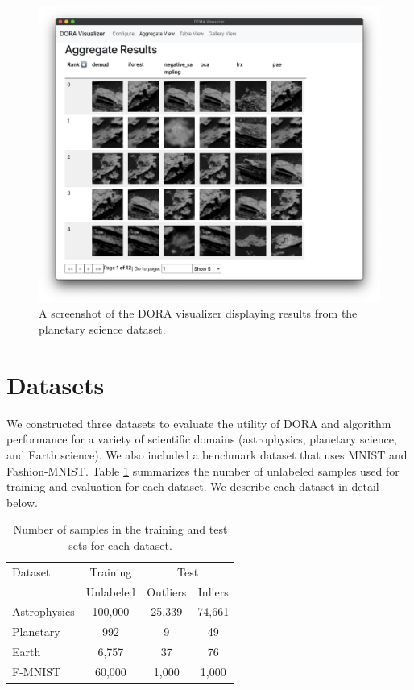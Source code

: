 \documentclass[utf8]{frontiersFPHY} %
\begin{document}
\begin{figure}
  \centering
  \includegraphics[width=0.83\linewidth]{figures/doravis.png}
  \caption{A screenshot of the DORA visualizer displaying results from the
  planetary science dataset.}
  \label{fig:doravis}
\end{figure}


\section{Datasets}
We constructed three datasets to evaluate the utility of DORA and 
algorithm performance for a variety of scientific domains
(astrophysics, planetary science, and Earth science). We also included a 
benchmark dataset that uses MNIST and Fashion-MNIST. Table \ref{tab:datasets}
summarizes the number of unlabeled samples used for training and evaluation for
each dataset. We describe each dataset in detail below.

\begin{table}
\caption{Number of samples in the training and test sets for each dataset.}
\label{tab:datasets}
\centering
\begin{tabular}{l|c|cc}
  \toprule
  Dataset & Training & \multicolumn{2}{c}{Test}\\
   & Unlabeled &  Outliers &  Inliers \\
  \midrule
  Astrophysics & 100,000   &  25,339 &  74,661 \\
  Planetary & 992 &  9 & 49 \\
  Earth & 6,757 & 37 & 76  \\
  F-MNIST & 60,000 & 1,000 & 1,000  \\
  \bottomrule
\end{tabular}
\end{table}
\end{document}
